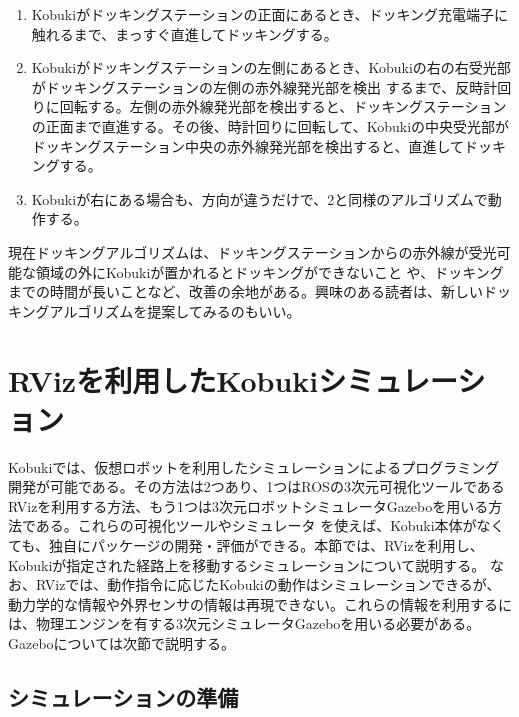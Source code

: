 \begin{enumerate}[leftmargin=*]
\item Kobukiがドッキングステーションの正面にあるとき、ドッキング充電端子に触れるまで、まっすぐ直進してドッキングする。

\item Kobukiがドッキングステーションの左側にあるとき、Kobukiの右の右受光部がドッキングステーションの左側の赤外線発光部を検出  するまで、反時計回りに回転する。左側の赤外線発光部を検出すると、ドッキングステーションの正面まで直進する。その後、時計回りに回転して、Kobukiの中央受光部がドッキングステーション中央の赤外線発光部を検出すると、直進してドッキングする。

\item Kobukiが右にある場合も、方向が違うだけで、2と同様のアルゴリズムで動作する。
\end{enumerate}

現在ドッキングアルゴリズムは、ドッキングステーションからの赤外線が受光可能な領域の外にKobukiが置かれるとドッキングができないこと   や、ドッキングまでの時間が長いことなど、改善の余地がある。興味のある読者は、新しいドッキングアルゴリズムを提案してみるのもいい。

\section{RVizを利用したKobukiシミュレーション}

Kobukiでは、仮想ロボットを利用したシミュレーションによるプログラミング開発が可能である。その方法は2つあり、1つはROSの3次元可視化ツールであるRVizを利用する方法、もう1つは3次元ロボットシミュレータGazeboを用いる方法である。これらの可視化ツールやシミュレータ  を使えば、Kobuki本体がなくても、独自にパッケージの開発・評価ができる。本節では、RVizを利用し、Kobukiが指定された経路上を移動するシミュレーションについて説明する。
なお、RVizでは、動作指令に応じたKobukiの動作はシミュレーションできるが、動力学的な情報や外界センサの情報は再現できない。これらの情報を利用するには、物理エンジンを有する3次元シミュレータGazeboを用いる必要がある。Gazeboについては次節で説明する。

\subsection{シミュレーションの準備}

